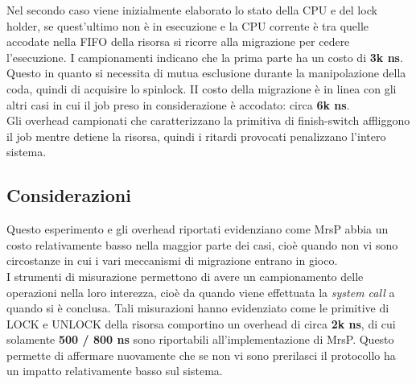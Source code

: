 Nel secondo caso viene inizialmente elaborato lo stato della CPU e del lock holder, se quest'ultimo non è in esecuzione e la CPU corrente è tra quelle accodate nella FIFO della risorsa si ricorre alla migrazione per cedere l'esecuzione. I campionamenti indicano che la prima parte ha un costo di \textbf{3k ns}. Questo in quanto si necessita di mutua esclusione durante la manipolazione della coda, quindi di acquisire lo spinlock. II costo della migrazione è in linea con gli altri casi in cui il job preso in considerazione è accodato: circa \textbf{6k ns}.\\

Gli overhead campionati che caratterizzano la primitiva di finish-switch affliggono il job mentre detiene la risorsa, quindi i ritardi provocati penalizzano l'intero sistema.

\subsection{Considerazioni}
\label{sec:overhead_cons}

Questo esperimento e gli overhead riportati evidenziano come MrsP abbia un costo relativamente basso nella maggior parte dei casi, cioè quando non vi sono circostanze in cui i vari meccanismi di migrazione entrano in gioco.\\

I strumenti di misurazione permettono di avere un campionamento delle operazioni nella loro interezza, cioè da quando viene effettuata la \textit{system call} a quando si è conclusa. Tali misurazioni hanno evidenziato come le primitive di LOCK e UNLOCK della risorsa comportino un overhead di circa \textbf{2k ns}, di cui solamente \textbf{500 / 800 ns} sono riportabili all'implementazione di MrsP. Questo permette di affermare nuovamente che se non vi sono prerilasci il protocollo ha un impatto relativamente basso sul sistema.\\




